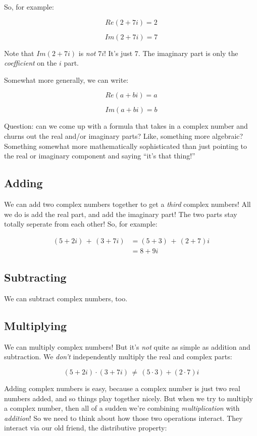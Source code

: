 \documentclass[
]{article}
\begin{document}
So, for example:

\[Re(2+7i) = 2\]

\[Im(2+7i) = 7\]

Note that \(Im(2+7i)\) is \emph{not} \(7i\)! It's just \(7\). The
imaginary part is only the \emph{coefficient} on the \(i\) part.

Somewhat more generally, we can write:

\[Re(a+bi) = a\]

\[Im(a+bi) = b\]

Question: can we come up with a formula that takes in a complex number
and churns out the real and/or imaginary parts? Like, something more
algebraic? Something somewhat more mathematically sophisticated than
just pointing to the real or imaginary component and saying ``it's that
thing!''

\hypertarget{adding}{%
\subsection{Adding}\label{adding}}

We can add two complex numbers together to get a \emph{third} complex
numbers! All we do is add the real part, and add the imaginary part! The
two parts stay totally seperate from each other! So, for example:

\[
\begin{align*}
(5+2i)\,+\,(3+7i) &= (5+3) \,+\,(2+7)i \\
&= 8 + 9i
\end{align*}
\]

\hypertarget{subtracting}{%
\subsection{Subtracting}\label{subtracting}}

We can subtract complex numbers, too.

\hypertarget{multiplying}{%
\subsection{Multiplying}\label{multiplying}}

We can multiply complex numbers! But it's \emph{not} quite as simple as
addition and subtraction. We \emph{don't} independently multiply the
real and complex parts:

\[(5+2i)\cdot(3+7i) \,\neq\, (5\cdot3) + (2\cdot7)i\]

Adding complex numbers is easy, because a complex number is just two
real numbers added, and so things play together nicely. But when we try
to multiply a complex number, then all of a sudden we're combining
\emph{multiplication} with \emph{addition}! So we need to think about
how those two operations interact. They interact via our old friend, the
distributive property:
\end{document}
